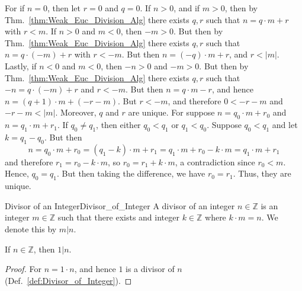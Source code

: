 \documentclass{article}                                                        %
\begin{document}
            \begin{bproof}
                For if $n=0$, then let $r=0$ and $q=0$. If $n>0$, and if $m>0$,
                then by Thm.~\ref{thm:Weak_Euc_Division_Alg} there exists
                $q,r$ such that $n=q\cdot{m}+r$ with $r<m$. If $n>0$ and $m<0$,
                then $\minus{m}>0$. But then by
                Thm.~\ref{thm:Weak_Euc_Division_Alg} there exists $q,r$ such that
                $n=q\cdot(\minus{m})+r$ with $r<\minus{m}$. But then
                $n=(\minus{q})\cdot{m}+r$, and $r<|m|$. Lastly, if
                $n<0$ and $m<0$, then $\minus{n}>0$ and $\minus{m}>0$. But then by
                Thm.~\ref{thm:Weak_Euc_Division_Alg} there exists $q,r$ such that
                $\minus{n}=q\cdot(\minus{m})+r$ and $r<\minus{m}$. But then
                $n=q\cdot{m}-r$, and hence $n=(q+1)\cdot{m}+(\minus{r}-m)$. But 
                $r<\minus{m}$, and therefore $0<\minus{r}-m$ and
                $\minus{r}-m<|m|$. Moreover, $q$ and $r$ are unique. For suppose
                $n=q_{0}\cdot{m}+r_{0}$ and $n=q_{1}\cdot{m}+r_{1}$. If
                $q_{0}\ne{q}_{1}$, then either $q_{0}<q_{1}$ or $q_{1}<q_{0}$.
                Suppose $q_{0}<q_{1}$ and let $k=q_{1}-q_{0}$. But then
                \begin{equation}
                    n=q_{0}\cdot{m}+r_{0}=(q_{1}-k)\cdot{m}+r_{1}
                        =q_{1}\cdot{m}+r_{0}-k\cdot{m}
                        =q_{1}\cdot{m}+r_{1}
                \end{equation}
                and therefore $r_{1}=r_{0}-k\cdot{m}$, so $r_{0}=r_{1}+k\cdot{m}$,
                a contradiction since $r_{0}<m$. Hence, $q_{0}=q_{1}$. But then
                taking the difference, we have $r_{0}=r_{1}$. Thus, they are unique.
            \end{bproof}
            \begin{fdefinition}{Divisor of an Integer}{Divisor_of_Integer}
                A divisor of an integer $n\in\mathbb{Z}$ is an integer
                $m\in\mathbb{Z}$ such that there exists and integer $k\in\mathbb{Z}$
                where $k\cdot{m}=n$. We denote this by $m|n$.
            \end{fdefinition}
            \begin{theorem}
                \label{thm:One_is_Divisor}%
                If $n\in\mathbb{Z}$, then $1|n$.
            \end{theorem}
            \begin{proof}
                For $n=1\cdot{n}$, and hence $1$ is a divisor of $n$
                (Def.~\ref{def:Divisor_of_Integer}).
            \end{proof}
\end{document}
